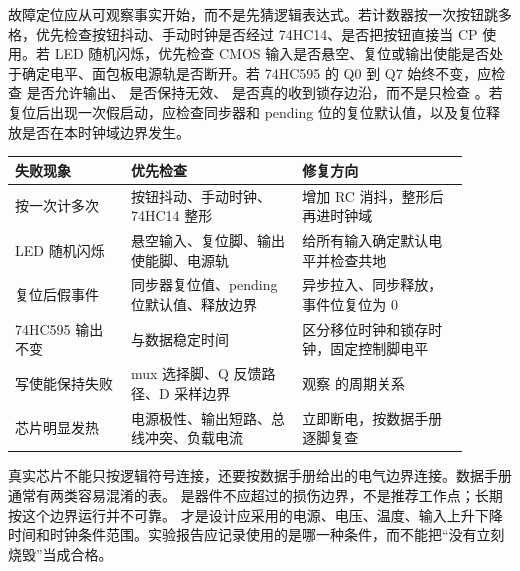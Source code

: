 故障定位应从可观察事实开始，而不是先猜逻辑表达式。若计数器按一次按钮跳多格，优先检查按钮抖动、手动时钟是否经过 74HC14、是否把按钮直接当 CP 使用。若 LED 随机闪烁，优先检查 CMOS 输入是否悬空、复位或输出使能是否处于确定电平、面包板电源轨是否断开。若 74HC595 的 Q0 到 Q7 始终不变，应检查  是否允许输出、 是否保持无效、 是否真的收到锁存边沿，而不是只检查 。若复位后出现一次假启动，应检查同步器和 pending 位的复位默认值，以及复位释放是否在本时钟域边界发生。

\begin{longtable}{L{0.23\linewidth}L{0.34\linewidth}L{0.33\linewidth}}
\toprule
失败现象 & 优先检查 & 修复方向 \\
\midrule
按一次计多次 & 按钮抖动、手动时钟、74HC14 整形 & 增加 RC 消抖，整形后再进时钟域 \\\tablerowrule
LED 随机闪烁 & 悬空输入、复位脚、输出使能脚、电源轨 & 给所有输入确定默认电平并检查共地 \\\tablerowrule
复位后假事件 & 同步器复位值、pending 位默认值、释放边界 & 异步拉入、同步释放，事件位复位为 0 \\\tablerowrule
74HC595 输出不变 &  与数据稳定时间 & 区分移位时钟和锁存时钟，固定控制脚电平 \\\tablerowrule
写使能保持失败 & mux 选择脚、Q 反馈路径、D 采样边界 & 观察  的周期关系 \\\tablerowrule
芯片明显发热 & 电源极性、输出短路、总线冲突、负载电流 & 立即断电，按数据手册逐脚复查 \\
\bottomrule
\end{longtable}

真实芯片不能只按逻辑符号连接，还要按数据手册给出的电气边界连接。数据手册通常有两类容易混淆的表。 是器件不应超过的损伤边界，不是推荐工作点；长期按这个边界运行并不可靠。 才是设计应采用的电源、电压、温度、输入上升下降时间和时钟条件范围。实验报告应记录使用的是哪一种条件，而不能把“没有立刻烧毁”当成合格。

